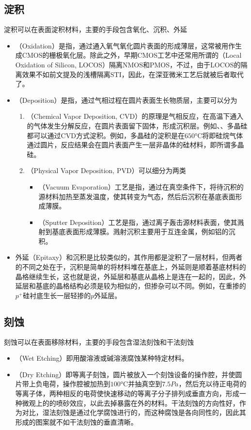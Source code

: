 \subsection{淀积}
淀积可以在表面淀积材料，主要的手段包含氧化、沉积、外延
\begin{itemize}
    \item {}（Oxidation）是指，通过通入氧气氧化圆片表面的形成薄层，这常被用作生成CMOS的栅极氧化层。除此之外，早期CMOS工艺中还常用所谓的（Local Oxidation of Silicon, LOCOS）隔离NMOS和PMOS，不过，由于LOCOS的隔离效果不如前文提及的浅槽隔离STI，因此，在深亚微米工艺后就被后者取代了。
    \item {}（Deposition）是指，通过气相过程在圆片表面生长物质层，主要可以分为
    \begin{enumerate}
        \item {}（Chemical Vapor Deposition, CVD）的原理是气相反应，在高温下通入的气体发生分解反应，在圆片表面留下固体，形成沉积层。例如、、多晶硅都可以通过CVD方式淀积。例如，多晶硅的淀积是在$650\si{\degreeCelsius}$将即硅烷气体通过圆片，反应结果会在圆片表面产生一层非晶体的硅材料，即所谓多晶硅。
        \item {}（Physical Vapor Deposition, PVD）可以细分为两类
        \begin{itemize}
            \item {}（Vacuum Evaporation）工艺是指，通过在真空条件下，将待沉积的源材料加热至蒸发温度，使其转变为气态，然后后沉积在基底表面形成薄膜。
            \item {}（Sputter Deposition）工艺是指，通过离子轰击源材料表面，使其溅射到基底表面形成薄膜。溅射沉积主要用于互连金属，例如铝的沉积。
        \end{itemize}
    \end{enumerate}
    \item 外延（Epitaxy）和沉积是比较类似的，其作用都是淀积了一层材料，但两者的不同之处在于，沉积是简单的将材料堆在基底上，外延则是顺着基底材料的晶格继续生长，这也就是说，外延层和基底从晶格上是连在一起的，因此，外延层和基底的晶格结构必须是较为相似的，但掺杂可以不同。例如，在重掺的$p^{+}$硅衬底生长一层轻掺的$p$外延层。
\end{itemize}

\subsection{刻蚀}
刻蚀可以在表面移除材料，主要的手段包含湿法刻蚀和干法刻蚀
\begin{itemize}
    \item {}（Wet Etching）即用酸溶液或碱溶液腐蚀某种特定材料。
    \item {}（Dry Etching）即等离子刻蚀，圆片被放入一个刻蚀设备的操作腔，并使圆片带上负电荷，操作腔被加热到$100\si{\degreeCelsius}$并抽真空到$7.5\si{Pa}$，然后充以待正电荷的等离子体，两种相反的电荷使快速移动的等离子分子排列成垂直方向，形成一种微观上的的喷砂效应，以此去掉暴露在外的材料。干法刻蚀的方向性好，作为对比，湿法刻蚀是通过化学腐蚀进行的，而这种腐蚀是各向同性的，因此其形成的图案就不如干法刻蚀的垂直清晰。
\end{itemize}

